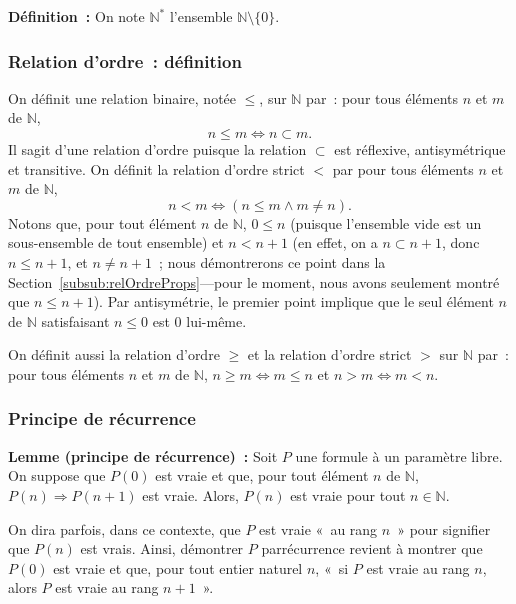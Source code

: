   \done 

\medskip

\noindent\textbf{Définition :} 
    On note $\mathbb{N}^*$ l'ensemble $\mathbb{N} \setminus \lbrace 0 \rbrace$.

\subsubsection{Relation d'ordre : définition}

On définit une relation binaire, notée $\leq$, sur $\mathbb{N}$ par : pour tous éléments $n$ et $m$ de $\mathbb{N}$, 
\begin{equation*}
    n \leq m \Leftrightarrow n \subset m .
\end{equation*}
Il sagit d'une relation d'ordre puisque la relation $\subset$ est réflexive, antisymétrique et transitive.
On définit la relation d'ordre strict $<$ par pour tous éléments $n$ et $m$ de $\mathbb{N}$, 
\begin{equation*}
    n < m \Leftrightarrow (n \leq m \wedge m \neq n).
\end{equation*}
Notons que, pour tout élément $n$ de $\mathbb{N}$, $0 \leq n$ (puisque l'ensemble vide est un sous-ensemble de tout ensemble) et $n < n+1$ (en effet, on a $n \subset n+1$, donc $n \leq n+1$, et $n \neq n+1$ ; nous démontrerons ce point dans la Section~\ref{subsub:relOrdreProps}—pour le moment, nous avons seulement montré que $n \leq n+1$). 
Par antisymétrie, le premier point implique que le seul élément $n$ de $\mathbb{N}$ satisfaisant $n \leq 0$ est $0$ lui-même.

On définit aussi la relation d'ordre $\geq$ et la relation d'ordre strict $>$ sur $\mathbb{N}$ par : pour tous éléments $n$ et $m$ de $\mathbb{N}$, $n \geq m \Leftrightarrow m \leq n$ et $n > m \Leftrightarrow m < n$.

\subsubsection{Principe de récurrence}
\label{subsub:recurrence}

\noindent\textbf{Lemme (principe de récurrence) :} Soit $P$ une formule à un paramètre libre. 
    On suppose que $P(0)$ est vraie et que, pour tout élément $n$ de $\mathbb{N}$, $P(n) \Rightarrow P(n+1)$ est vraie. 
    Alors, $P(n)$ est vraie pour tout $n \in \mathbb{N}$.

On dira parfois, dans ce contexte, que $P$ est vraie « au rang $n$ » pour signifier que $P(n)$ est vrais. 
Ainsi, démontrer $P$ parrécurrence revient à montrer que $P(0)$ est vraie et que, pour tout entier naturel $n$, « si $P$ est vraie au rang $n$, alors $P$ est vraie au rang $n+1$ ».

